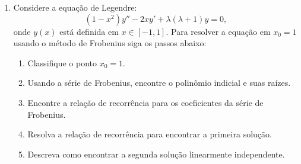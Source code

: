 \begin{enumerate}
	\item Considere a equação de Legendre:
	      \[(1-x^2)y'' - 2xy' + \lambda(\lambda+1)y = 0,\]
	      onde \(y(x)\) está definida em \(x \in [-1,1]\). Para resolver a equação em $x_0=1$
	      usando o método de Frobenius siga os passos abaixo:
	      \begin{enumerate}
		      \item Classifique o ponto $x_0 = 1$.
		      \item Usando a série de Frobenius, encontre o polinômio indicial e suas raízes.
		      \item Encontre a relação de recorrência para os coeficientes da série de Frobenius.
		      \item Resolva a relação de recorrência para encontrar a primeira solução.
		      \item Descreva como encontrar a segunda solução linearmente independente.
	      \end{enumerate}

\end{enumerate}


